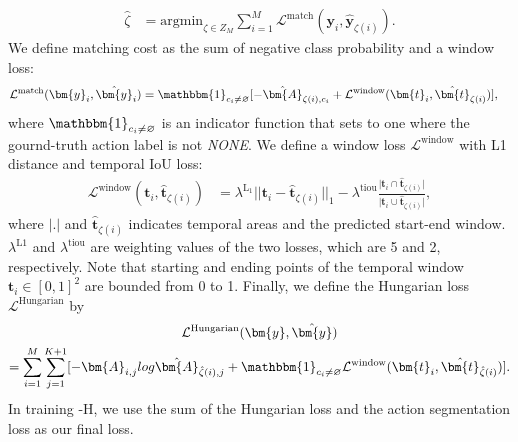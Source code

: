 \begin{align}
    \hat{\zeta} &= \mathrm{argmin}_{\zeta \in Z_M}\sum_{i=1}^M\mathcal{L}^{\mathrm{match}}(\bm{y}_i, \hat{\bm{y}}_{\zeta(i)}).
\end{align}
We define matching cost as the sum of negative class probability and a window loss:
\begin{align}
     \mathcal{L}^{\mathrm{match}}(\bm{y}_i, \hat{\bm{y}}_i) &= \mathbbm{1}_{c_i\neq \varnothing}[-\hat{\bm{A}}_{\zeta(i),c_i} +\mathcal{L}^{\mathrm{window}}(\bm{t}_i,\hat{\bm{t}}_{\zeta(i)})],
\end{align}
where $\mathbbm{1}_{c_i\neq\varnothing}$ is an indicator function that sets to one where the gournd-truth action label is not \textit{NONE}.
We define a window loss $\mathcal{L}^{\textrm{window}}$ with L1 distance and temporal IoU loss:
\begin{align}
    \mathcal{L}^\mathrm{window}(\bm{t}_i, \hat{\bm{t}}_{\zeta(i)}) &= \lambda^\mathrm{L_1}\lvert\lvert \bm{t}_i- \hat{\bm{t}}_{\zeta(i)}\rvert\rvert_1 - \lambda^\mathrm{tiou} \frac{\lvert \bm{t}_i \cap \hat{\bm{t}}_{\zeta(i)} \rvert}{\lvert \bm{t}_i \cup \hat{\bm{t}}_{\zeta(i)}\rvert},
\end{align}
where $|.|$ and $\hat{\bm{t}}_{\zeta(i)}$ indicates temporal areas and the predicted start-end window. 
$\lambda^\mathrm{L1}$ and $\lambda^\mathrm{tiou}$ are weighting values of the two losses, which are 5 and 2, respectively.
Note that starting and ending points of the temporal window $\bm{t}_i \in [0,1]^2$ are bounded from 0 to 1.
Finally, we define the Hungarian loss $ \mathcal{L}^\mathrm{Hungarian}$ by 
\begin{multline}
    \mathcal{L}^\mathrm{Hungarian}(\bm{y}, \hat{\bm{y}}) \\
    = \sum_{i=1}^M\sum_{j=1}^{K+1}[-{\bm{A}}_{i,j}log\hat{\bm{A}}_{\hat{\zeta}(i),j}+
        \mathbbm{1}_{c_i\neq \varnothing}\mathcal{L}^{\mathrm{window}}(\bm{t}_i, \hat{\bm{t}}_{\hat{\zeta}(i)})].
\end{multline}
In training \ours-H, we use the sum of the Hungarian loss and the action segmentation loss as our final loss. 




